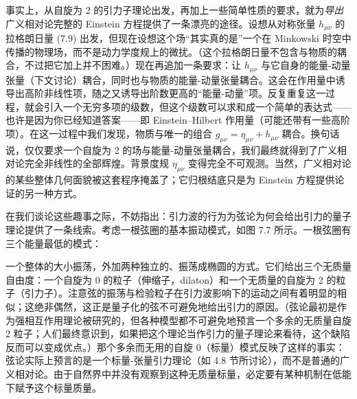 

事实上，从自旋为 2 的引力子理论出发，再加上一些简单性质的要求，就为\emph{导出}广义相对论完整的 Einstein 方程提供了一条漂亮的途径。设想从对称张量 $h_{\mu\nu}$ 的拉格朗日量 (7.9) 出发，但现在设想这个场“其实真的是”一个在 Minkowski 时空中传播的物理场，而不是动力学度规上的微扰。（这个拉格朗日量不包含与物质的耦合，不过把它加上并不困难。）现在再追加一条要求：让 $h_{\mu\nu}$ 与它自身的能量-动量张量（下文讨论）耦合，同时也与物质的能量-动量张量耦合。这会在作用量中诱导出高阶非线性项，随之又诱导出阶数更高的“能量-动量”项。反复重复这一过程，就会引入一个无穷多项的级数，但这个级数可以求和成一个简单的表达式——也许是因为你已经知道答案——即 Einstein--Hilbert 作用量（可能还带有一些高阶项）。在这一过程中我们发现，物质与唯一的组合 $g_{\mu\nu} = \eta_{\mu\nu} + h_{\mu\nu}$ 耦合。换句话说，仅仅要求一个自旋为 2 的场与能量-动量张量耦合，我们最终就得到了广义相对论完全非线性的全部辉煌。背景度规 $\eta_{\mu\nu}$ 变得完全不可观测。当然，广义相对论的某些整体几何面貌被这套程序掩盖了；它归根结底只是为 Einstein 方程提供论证的另一种方式。

在我们谈论这些趣事之际，不妨指出：引力波的行为为弦论为何会给出引力的量子理论提供了一条线索。考虑一根弦圈的基本振动模式，如图 7.7 所示。一根弦圈有三个能量最低的模式：


一个整体的大小振荡，外加两种独立的、振荡成椭圆的方式。它们给出三个无质量自由度：一个自旋为 0 的粒子（伸缩子，dilaton）和一个无质量的自旋为 2 的粒子（引力子）。注意弦的振荡与检验粒子在引力波影响下的运动之间有着明显的相似；这绝非偶然，这正是量子化的弦不可避免地给出引力的原因。（弦论最初是作为强相互作用理论被研究的，但各种模型都不可避免地预言一个多余的无质量自旋 2 粒子；人们最终意识到，如果把这个理论当作引力的量子理论来看待，这个缺陷反而可以变成优点。）那个多余而无用的自旋 0（标量）模式反映了这样的事实：弦论实际上预言的是一个标量-张量引力理论（如 4.8 节所讨论），而不是普通的广义相对论。由于自然界中并没有观察到这种无质量标量，必定要有某种机制在低能下赋予这个标量质量。

